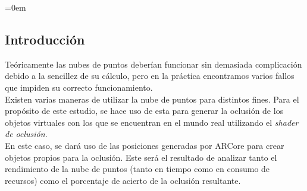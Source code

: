 \parindent=0em
\subsection{Introducción}
\noindent

Teóricamente las nubes de puntos deberían funcionar sin demasiada complicación debido a la sencillez de su cálculo, pero en la práctica encontramos varios fallos que impiden su correcto funcionamiento.\\

Existen varias maneras de utilizar la nube de puntos para distintos fines. Para el propósito de este estudio, se hace uso de esta para generar la oclusión de los objetos virtuales con los que se encuentran en el mundo real utilizando el \textit{shader de oclusión}. \\

En este caso, se dará uso de las posiciones generadas por ARCore para crear objetos propios para la oclusión. Este será el resultado de analizar tanto el rendimiento de la nube de puntos (tanto en tiempo como en consumo de recursos) como el porcentaje de acierto de la oclusión resultante.\\